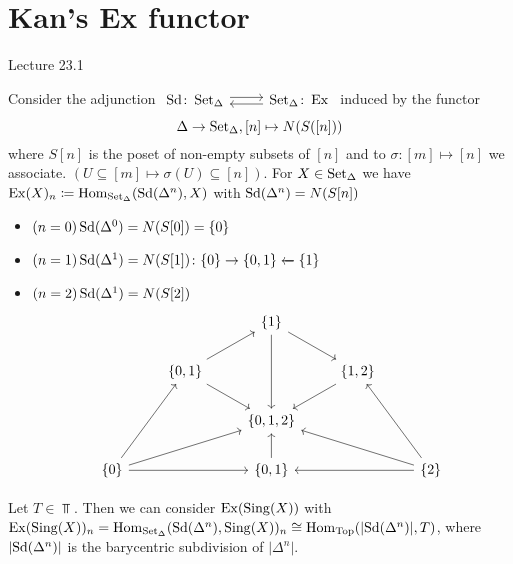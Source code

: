 \section{Kan's Ex functor}

Lecture 23.1

Consider the adjunction 
$\begin{tikzcd}
    \Sd\colon \SetD
    \ar[r, shift left]
    &
    \SetD\colon\Ex
    \ar[l, shift left]
\end{tikzcd}$
induced by the functor 
\[
\Delta \to \operatorname{Set}_{\Delta}, [n] \mapsto N(S([n]))
\]
where $S[n]$ is the poset of non-empty subsets of $[n]$ and to $\sigma \colon [m] \mapsto [n]$ we associate.
$(U \subseteq [m] \mapsto \sigma(U) \subseteq [n])$.
For $X \in \operatorname{Set}_{\Delta}$ we have $\operatorname{Ex}(X)_n \coloneqq \operatorname{Hom}_{\operatorname{Set}_{\Delta}}(\operatorname{Sd}(\Delta^n),X)$ with $\operatorname{Sd}(\Delta^n)=N(S[n])$

\begin{exmp}
    \begin{itemize}
        \item 
        $(n=0) \operatorname{Sd}(\Delta^0) = N(S[0])=\{0\}$
        \item 
        $(n=1) \operatorname{Sd}(\Delta^1)=N(S[1]) \colon \{0\} \to \{ 0,1 \} \xleftarrow{}\{1\}$
        \item 
        $ (n=2) \operatorname{Sd}( \Delta^1) = N(S[2])$
        \[
        \begin{tikzcd}
            &&
            \{1\}
            \ar[rd]
            \ar[dd]
            \\
            &
            \{0,1\}
            \ar[rd]
            \ar[ru]
            &
            &
            \{1,2\}
            \ar[ld]
            \\
            &&
            \{0,1,2\}
            &&
            \\
            \{0\}
            \ar[ruu]
            \ar[rr]
            \ar[rru]
            &&
            \{0,1\}
            \ar[u]
            &&
            \{2\}
            \ar[ll]
            \ar[llu]
            \ar[luu]
        \end{tikzcd}
        \]
    \end{itemize}    
\end{exmp}

\begin{exmp}
    Let $T \in \Top$. Then we can consider $\operatorname{Ex}(\operatorname{Sing}(X))$ with $\operatorname{Ex}(\operatorname{Sing}(X))_n=\operatorname{Hom}_{\operatorname{Set}_{\Delta}}(\operatorname{Sd}(\Delta^n),\operatorname{Sing}(X))_n \cong \operatorname{Hom}_{\operatorname{Top}}(\lvert\operatorname{Sd}(\Delta^n)\rvert, T)$, where $\lvert\operatorname{Sd}(\Delta^n)\rvert$ is the barycentric subdivision of $\lvert\Delta^n\rvert$.
\end{exmp}    
    
